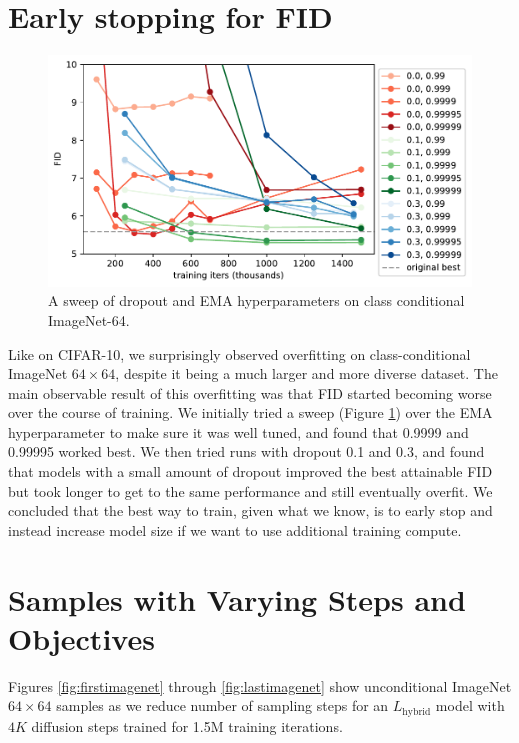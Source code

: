 \documentclass{article}
\begin{document}
\newpage
\section{Early stopping for FID}
\begin{figure}[ht]
    \centering
    \includegraphics[width=\columnwidth]{ema_sweep_full_fid_v4-eps.pdf}
    \caption{\label{fig:emasweep} A sweep of dropout and EMA hyperparameters on class conditional ImageNet-64.}
\end{figure}
Like on CIFAR-10, we surprisingly observed overfitting on class-conditional ImageNet $64 \times 64$, despite it being a much larger and more diverse dataset. The main observable result of this overfitting was that FID started becoming worse over the course of training. We initially tried a sweep (Figure \ref{fig:emasweep}) over the EMA hyperparameter to make sure it was well tuned, and found that 0.9999 and 0.99995 worked best. We then tried runs with dropout 0.1 and 0.3, and found that models with a small amount of dropout improved the best attainable FID but took longer to get to the same performance and still eventually overfit. We concluded that the best way to train, given what we know, is to early stop and instead increase model size if we want to use additional training compute. 



\section{Samples with Varying Steps and Objectives}
\label{app:samples}

Figures \ref{fig:firstimagenet} through \ref{fig:lastimagenet} show unconditional ImageNet $64 \times 64$ samples as we reduce number of sampling steps for an $L_{\text{hybrid}}$ model with $4K$ diffusion steps trained for 1.5M training iterations.
\end{document}
